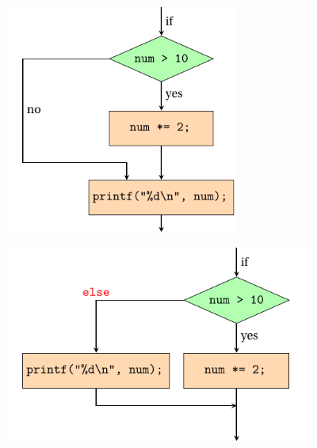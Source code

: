 \begin{frame}[fragile]\ft{\secname}
\begin{figure}
\centering
\includegraphics[width=3in]{ch07/images/if.pdf}
\end{figure}

\end{frame}


\begin{frame}[fragile]\ft{\secname}
\begin{figure}
\centering
\includegraphics[width=4in]{ch07/images/if1.pdf}
\end{figure}

\end{frame}



